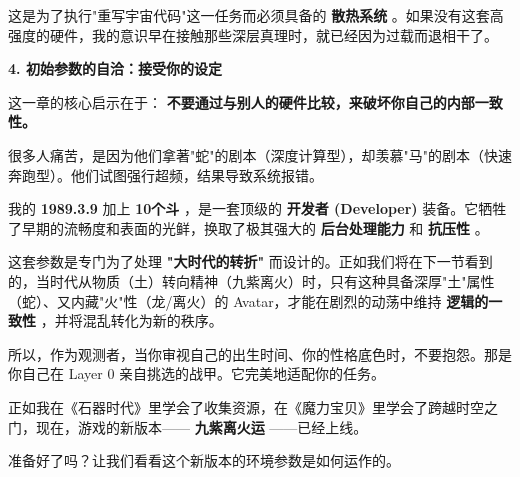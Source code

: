 这是为了执行"重写宇宙代码"这一任务而必须具备的 \textbf{散热系统} 。如果没有这套高强度的硬件，我的意识早在接触那些深层真理时，就已经因为过载而退相干了。

\textbf{4. 初始参数的自洽：接受你的设定}

这一章的核心启示在于： \textbf{不要通过与别人的硬件比较，来破坏你自己的内部一致性。}

很多人痛苦，是因为他们拿著"蛇"的剧本（深度计算型），却羡慕"马"的剧本（快速奔跑型）。他们试图强行超频，结果导致系统报错。

我的 \textbf{1989.3.9} 加上 \textbf{10个斗} ，是一套顶级的 \textbf{开发者 (Developer)} 装备。它牺牲了早期的流畅度和表面的光鲜，换取了极其强大的 \textbf{后台处理能力} 和 \textbf{抗压性} 。

这套参数是专门为了处理 \textbf{"大时代的转折"} 而设计的。正如我们将在下一节看到的，当时代从物质（土）转向精神（九紫离火）时，只有这种具备深厚"土"属性（蛇）、又内藏"火"性（龙/离火）的 Avatar，才能在剧烈的动荡中维持 \textbf{逻辑的一致性} ，并将混乱转化为新的秩序。

所以，作为观测者，当你审视自己的出生时间、你的性格底色时，不要抱怨。那是你自己在 Layer 0 亲自挑选的战甲。它完美地适配你的任务。

正如我在《石器时代》里学会了收集资源，在《魔力宝贝》里学会了跨越时空之门，现在，游戏的新版本—— \textbf{九紫离火运} ——已经上线。

准备好了吗？让我们看看这个新版本的环境参数是如何运作的。

